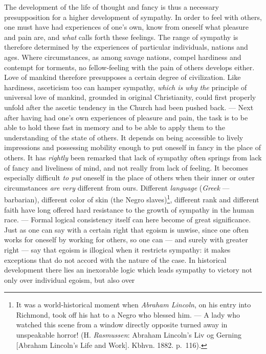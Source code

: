 \documentclass[12pt,a4paper]{book}
\newcommand{\opage}[1]{\marginnote{\footnotesize\textit{[#1]}}}
\begin{document}
The development of the life of thought and fancy is thus a necessary
presupposition for a higher development of sympathy. In order to feel
with others, one must have had experiences of one's own, know from
oneself what pleasure and pain are, and \emph{what} calls forth these
feelings. The range of sympathy is therefore determined by the
experiences of particular individuals, nations and ages. Where
circumstances, as among savage nations, compel hardiness and contempt
for torments, no fellow-feeling with the pain of others develops either.
Love of mankind therefore presupposes a certain degree of civilization.
Like hardiness, asceticism too can hamper sympathy, \emph{which is why
the} principle of universal love of mankind, grounded in original
Christianity, could first properly unfold after the ascetic tendency in
the Church had been pushed back. --- Next after having had one's own
experiences of pleasure and pain, the task is to be able to hold these
fast in memory and to be able to apply them to the understanding of the
state of others. It depends on being accessible to lively impressions
and possessing mobility enough to put oneself in fancy in the place of
others. It has \emph{rightly} been remarked that lack of sympathy often
springs from lack of fancy and liveliness of mind, and not really from
lack of feeling. It becomes especially difficult \emph{to put} oneself
in the place of others when their inner or outer circumstances \emph{are
very} different from ours. Different \emph{language} (\emph{Greek} ---
barbarian), different color of skin
(the Negro slaves)\footnote{It was a world-historical moment when
\emph{Abraham Lincoln}, on his entry into Richmond, took off his hat to
a Negro who blessed him. --- A lady who watched this scene from a
window directly opposite turned away in unspeakable horror! (H.
\emph{Rasmussen}: Abraham Lincoln's Liv og Gerning [Abraham Lincoln's
Life and Work]. Kbhvn. 1882. p.~116).}, different
\opage{307}rank and different faith have long offered hard resistance to
the growth of sympathy in the human race. --- Formal logical consistency
itself can here become of great significance. Just as one can say with a
certain right that egoism is unwise, since one often works for oneself
by working for others, so one can --- and surely with greater right ---
say that egoism is illogical when it restricts sympathy: it makes
exceptions that do not accord with the nature of the case. In
historical development there lies an inexorable logic which leads
sympathy to victory not only over individual egoism, but also over
\end{document}
